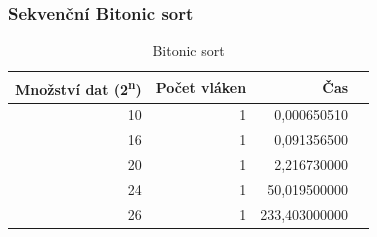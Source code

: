 \documentclass[12pt]{article}
\begin{document}
\subsubsection{Sekvenční Bitonic sort}
\begin{table}[H]
\begin{center}
\begin{tabular}{|r|r|r|r|}
\hline Množství dat (2\textsuperscript{n}) & Počet vláken & Čas \\ \hline
10  & 1 & 0,000650510 \\ \hline
16  & 1 & 0,091356500 \\ \hline
20  & 1 & 2,216730000 \\ \hline
24  & 1 & 50,019500000 \\ \hline
26  & 1 & 233,403000000 \\ \hline
\end{tabular} 
\end{center}
\caption{Bitonic sort}
\end{table}
\end{document}
